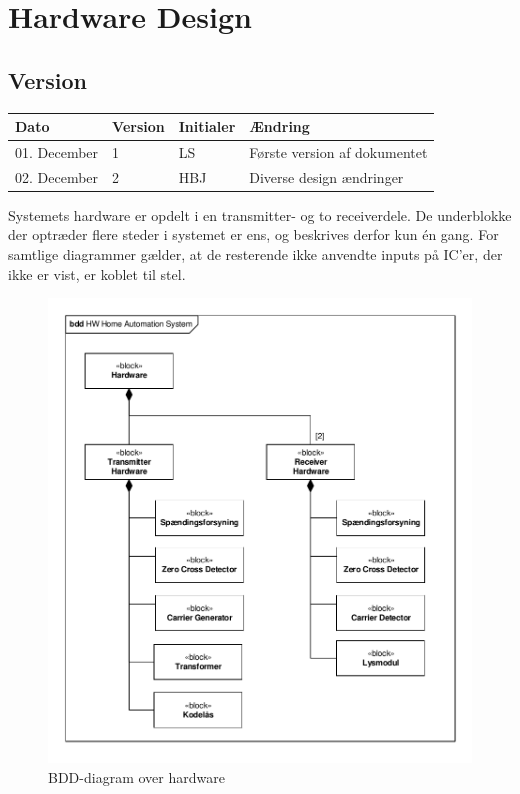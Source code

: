 \chapter{Hardware Design} \label{chap:HardwareDesign}

\section{Version}
\begin{table}[h]
	\centering
	\begin{tabularx}{\textwidth - 2cm}{|l|l| l|X|}
	\hline
	Dato	& Version	& Initialer & Ændring	\\ \hline
	01. December & 1 & LS	& Første version af dokumentet \\ \hline
	02. December & 2 & HBJ	& Diverse design ændringer \\ \hline
	\end{tabularx}
\end{table}

Systemets hardware er opdelt i en transmitter- og to receiverdele. 
De underblokke der optræder flere steder i systemet er ens, og beskrives derfor kun én gang. For samtlige diagrammer gælder, at de resterende ikke anvendte inputs på IC'er, der ikke er vist, er koblet til stel.

\begin{figure}[h]
	\centering
	\includegraphics[scale=0.75, trim=10 10 10 10, clip=true]{../HardwareDesign/Diagrammer/BDD_HW.pdf}
	\caption{BDD-diagram over hardware}
	\label{fig:HWBDD}
\end{figure}

